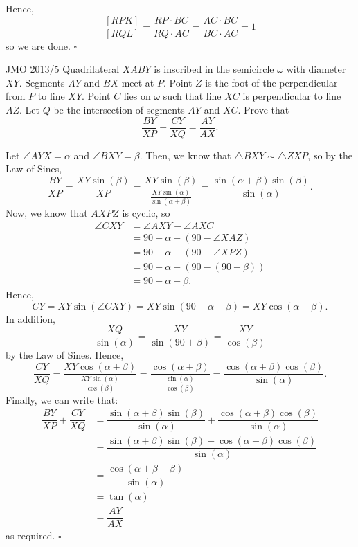 \documentclass{article}
\begin{document}
Hence, \[\dfrac{[RPK]}{[RQL]} = \dfrac{RP\cdot BC}{RQ\cdot AC} = \dfrac{AC\cdot BC}{BC\cdot AC} = 1\] so we are done. $\square$

\begin{problem}[5.25]{JMO 2013/5}
Quadrilateral $XABY$ is inscribed in the semicircle $\omega$ with diameter $XY$.  Segments $AY$ and $BX$ meet at $P$.  Point $Z$ is the foot of the perpendicular from $P$ to line $XY$.  Point $C$ lies on $\omega$ such that line $XC$ is perpendicular to line $AZ$.  Let $Q$ be the intersection of segments $AY$ and $XC$.  Prove that \[\dfrac{BY}{XP}+\dfrac{CY}{XQ}=\dfrac{AY}{AX}.\]
\end{problem}

Let $\angle AYX = \alpha$ and $\angle BXY = \beta$. Then, we know that $\triangle BXY \sim \triangle ZXP$, so by the Law of Sines, \[\dfrac{BY}{XP} = \dfrac{XY\sin(\beta)}{XP} = \dfrac{XY\sin(\beta)}{\tfrac{XY\sin(\alpha)}{\sin(\alpha+\beta)}} = \dfrac{\sin(\alpha+\beta)\sin(\beta)}{\sin(\alpha)}.\] Now, we know that $AXPZ$ is cyclic, so 
\begin{align*}
\angle CXY &= \angle AXY - \angle AXC \\
&= 90-\alpha-(90-\angle XAZ) \\
&= 90-\alpha-(90-\angle XPZ) \\
&= 90-\alpha-(90-(90-\beta)) \\
&= 90-\alpha-\beta.
\end{align*}
Hence, \[CY = XY\sin(\angle CXY) = XY\sin(90-\alpha-\beta) = XY\cos(\alpha+\beta).\] In addition, \[\dfrac{XQ}{\sin(\alpha)} = \dfrac{XY}{\sin(90+\beta)} = \dfrac{XY}{\cos(\beta)}\] by the Law of Sines. Hence, \[\dfrac{CY}{XQ} = \dfrac{XY\cos(\alpha+\beta)}{\tfrac{XY\sin(\alpha)}{\cos(\beta)}} = \dfrac{\cos(\alpha+\beta)}{\tfrac{\sin(\alpha)}{\cos(\beta)}} = \dfrac{\cos(\alpha+\beta)\cos(\beta)}{\sin(\alpha)}.\] Finally, we can write that:
\begin{align*}
\dfrac{BY}{XP}+\dfrac{CY}{XQ} &= \dfrac{\sin(\alpha+\beta)\sin(\beta)}{\sin(\alpha)} + \dfrac{\cos(\alpha+\beta)\cos(\beta)}{\sin(\alpha)} \\
&= \dfrac{\sin(\alpha+\beta)\sin(\beta)+\cos(\alpha+\beta)\cos(\beta)}{\sin(\alpha)} \\
&= \dfrac{\cos(\alpha+\beta-\beta)}{\sin(\alpha)} \\
&= \tan(\alpha) \\
&= \dfrac{AY}{AX}
\end{align*}
as required. $\square$
\end{document}
